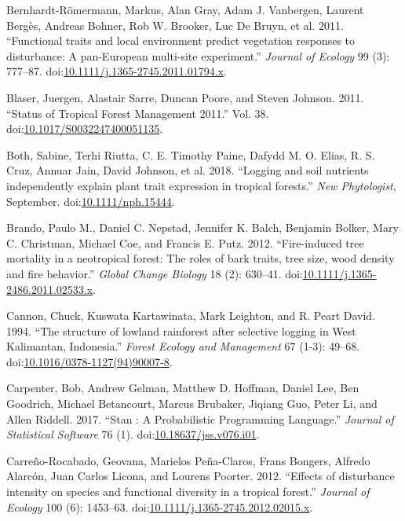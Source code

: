 \documentclass[]{elsarticle} %
\begin{document}
\hypertarget{ref-Bernhardt-Romermann2011}{}
Bernhardt-Römermann, Markus, Alan Gray, Adam J. Vanbergen, Laurent
Bergès, Andreas Bohner, Rob W. Brooker, Luc De Bruyn, et al. 2011.
``Functional traits and local environment predict vegetation responses
to disturbance: A pan-European multi-site experiment.'' \emph{Journal of
Ecology} 99 (3): 777--87.
doi:\href{https://doi.org/10.1111/j.1365-2745.2011.01794.x}{10.1111/j.1365-2745.2011.01794.x}.

\hypertarget{ref-Blaser2011}{}
Blaser, Juergen, Alastair Sarre, Duncan Poore, and Steven Johnson. 2011.
``Status of Tropical Forest Management 2011.'' Vol. 38.
doi:\href{https://doi.org/10.1017/S0032247400051135}{10.1017/S0032247400051135}.

\hypertarget{ref-Both2018}{}
Both, Sabine, Terhi Riutta, C. E. Timothy Paine, Dafydd M. O. Elias, R.
S. Cruz, Annuar Jain, David Johnson, et al. 2018. ``Logging and soil
nutrients independently explain plant trait expression in tropical
forests.'' \emph{New Phytologist}, September.
doi:\href{https://doi.org/10.1111/nph.15444}{10.1111/nph.15444}.

\hypertarget{ref-Brando2012}{}
Brando, Paulo M., Daniel C. Nepstad, Jennifer K. Balch, Benjamin Bolker,
Mary C. Christman, Michael Coe, and Francis E. Putz. 2012.
``Fire-induced tree mortality in a neotropical forest: The roles of bark
traits, tree size, wood density and fire behavior.'' \emph{Global Change
Biology} 18 (2): 630--41.
doi:\href{https://doi.org/10.1111/j.1365-2486.2011.02533.x}{10.1111/j.1365-2486.2011.02533.x}.

\hypertarget{ref-Cannon1994}{}
Cannon, Chuck, Kuswata Kartawinata, Mark Leighton, and R. Peart David.
1994. ``The structure of lowland rainforest after selective logging in
West Kalimantan, Indonesia.'' \emph{Forest Ecology and Management} 67
(1-3): 49--68.
doi:\href{https://doi.org/10.1016/0378-1127(94)90007-8}{10.1016/0378-1127(94)90007-8}.

\hypertarget{ref-Carpenter2015}{}
Carpenter, Bob, Andrew Gelman, Matthew D. Hoffman, Daniel Lee, Ben
Goodrich, Michael Betancourt, Marcus Brubaker, Jiqiang Guo, Peter Li,
and Allen Riddell. 2017. ``Stan : A Probabilistic Programming
Language.'' \emph{Journal of Statistical Software} 76 (1).
doi:\href{https://doi.org/10.18637/jss.v076.i01}{10.18637/jss.v076.i01}.

\hypertarget{ref-Carreno-Rocabado2012}{}
Carreño-Rocabado, Geovana, Marielos Peña-Claros, Frans Bongers, Alfredo
Alarcón, Juan Carlos Licona, and Lourens Poorter. 2012. ``Effects of
disturbance intensity on species and functional diversity in a tropical
forest.'' \emph{Journal of Ecology} 100 (6): 1453--63.
doi:\href{https://doi.org/10.1111/j.1365-2745.2012.02015.x}{10.1111/j.1365-2745.2012.02015.x}.
\end{document}
